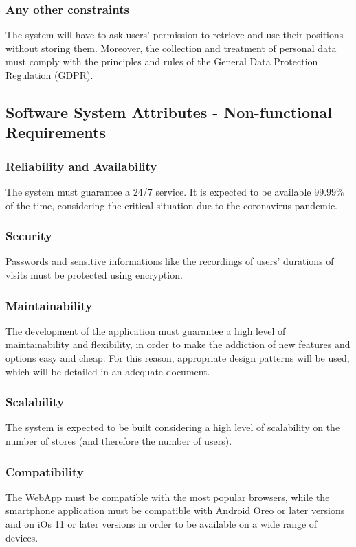 \documentclass{article}
\begin{document}
\subsubsection{Any other constraints}
The system will have to ask users' permission to retrieve and use their positions without storing them. Moreover, the collection and treatment of personal data must comply with the principles and rules of the General Data Protection Regulation (GDPR).

\subsection{Software System Attributes - Non-functional Requirements}
\subsubsection{Reliability and Availability}
The system must guarantee a 24/7 service. It is expected to be available 99.99\% of the time, considering the critical situation due to the coronavirus pandemic.
\subsubsection{Security}
Passwords and sensitive informations like the recordings of users' durations of visits must be protected using encryption.
\subsubsection{Maintainability}
The development of the application must guarantee a high level of maintainability and flexibility, in order to make the addiction of new features and options easy and cheap. For this reason, appropriate design patterns will be used, which will be detailed in an adequate document.
\subsubsection{Scalability}
The system is expected to be built considering a high level of scalability on the number of stores (and therefore the number of users).
\subsubsection{Compatibility}
The WebApp must be compatible with the most popular browsers, while the smartphone application must be compatible with Android Oreo or later versions and on iOs 11 or later versions in order to be available on a wide range of devices.
\end{document}
